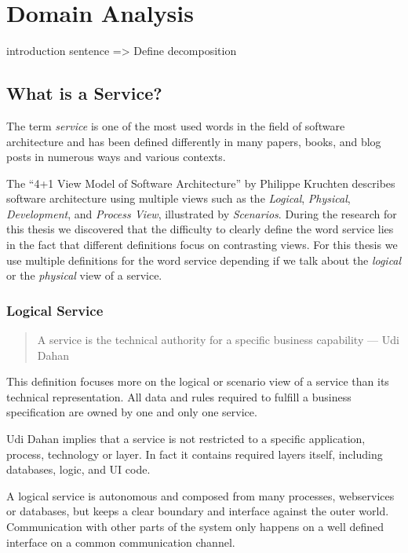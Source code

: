 
\chapter{Domain Analysis}
\label{cha:analysis}

introduction sentence %
=> Define decomposition

\section{What is a Service?}

The term \textit{service} is one of the most used words in the field of software architecture and has been defined differently in many papers, books, and blog posts in numerous ways and various contexts. 

The \enquote{4+1 View Model of Software Architecture} by Philippe Kruchten\cite{fourPlusOne} describes software architecture using multiple views such as the \textit{Logical}, \textit{Physical}, \textit{Development}, and \textit{Process View}, illustrated by \textit{Scenarios}. During the research for this thesis we discovered that the difficulty to clearly define the word service lies in the fact that different definitions focus on contrasting views. For this thesis we use multiple definitions for the word service depending if we talk about the \textit{logical} or the \textit{physical} view of a service.

\subsection{Logical Service}

\begin{quotation}
A service is the technical authority for a specific business capability --- Udi Dahan\cite{serviceDefinitionDahan}
\end{quotation}
   
This definition focuses more on the logical or scenario view of a service than its technical representation. All data and rules required to fulfill a business specification are owned by one and only one service. 

Udi Dahan implies that a service is not restricted to a specific application, process, technology or layer. In fact it contains required layers itself, including databases, logic, and \gls{UI} code.

A logical service is autonomous and composed from many processes, webservices or databases, but keeps a clear boundary and interface against the outer world. Communication with other parts of the system only happens on a well defined interface on a common communication channel.

